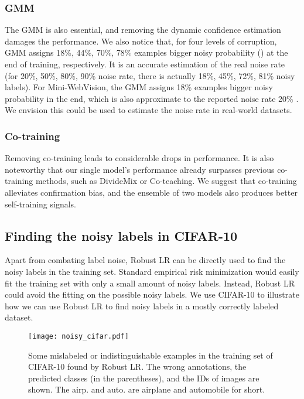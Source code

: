 \documentclass[letterpaper]{article} \usepackage{aaai23}  \usepackage{times}  \usepackage{helvet}  \usepackage{courier}  \usepackage[hyphens]{url}  \usepackage{graphicx} \urlstyle{rm} \def\UrlFont{\rm}  \usepackage{natbib}  \usepackage{caption} \frenchspacing  \setlength{\pdfpagewidth}{8.5in} \setlength{\pdfpageheight}{11in} \usepackage{algorithm}
\begin{document}
\subsubsection{GMM}
The GMM is also essential, and removing the dynamic confidence estimation damages the performance.
We also notice that, for four levels of corruption, GMM assigns 18\%, 44\%, 70\%, 78\% examples bigger noisy probability () at the end of training, respectively.
It is an accurate estimation of the real noise rate (for 20\%, 50\%, 80\%, 90\% noise rate, there is actually 18\%, 45\%, 72\%, 81\% noisy labels).
For Mini-WebVision, the GMM assigns 18\% examples bigger noisy probability in the end, which is also approximate to the reported noise rate 20\% \cite{li2017webvision}.
We envision this could be used to estimate the noise rate in real-world datasets.


\subsubsection{Co-training}
Removing co-training leads to considerable drops in performance.
It is also noteworthy that our single model's performance already surpasses previous co-training methods, such as DivideMix or Co-teaching.
We suggest that co-training alleviates confirmation bias, and the ensemble of two models also produces better self-training signals.

\subsection{Finding the noisy labels in CIFAR-10}
Apart from combating label noise, Robust LR can be directly used to find the noisy labels in the training set.
Standard empirical risk minimization would easily fit the training set with only a small amount of noisy labels.
Instead, Robust LR could avoid the fitting on the possible noisy labels.
We use CIFAR-10 to illustrate how we can use Robust LR to find noisy labels in a mostly correctly labeled dataset.

\begin{figure}
    \centering
    \texttt{[image: noisy\_cifar.pdf]} 
    \caption{Some mislabeled or indistinguishable examples in the training set of CIFAR-10 found by Robust LR. 
            The wrong annotations, the predicted classes (in the parentheses), and the IDs of images are shown.
            The airp. and auto. are airplane and automobile for short.
            } 
    \label{labelerror}
\end{figure}
\end{document}
